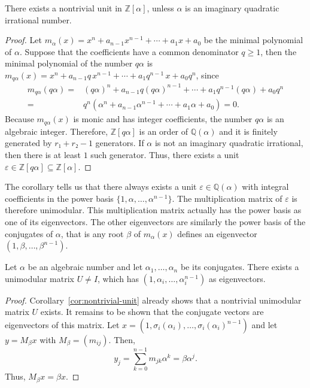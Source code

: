 \begin{corollary}
  \label{cor:nontrivial-unit}
  There exists a nontrivial unit in $ℤ[α]$,
  unless $α$ is an imaginary quadratic irrational number.
\end{corollary}

\begin{proof}
  Let $m_α(x) = x^n + a_{n-1} x^{n-1} + ⋯ + a_1 x + a_0$ be the minimal polynomial of $α$.
  Suppose that the coefficients have a common denominator $q ≥ 1$,
  then the minimal polynomial of the number $q α$ is
  $m_{q α}(x) = x^n + a_{n-1} q \, x^{n-1} + ⋯ + a_1 q^{n-1} \, x + a_0 q^n$,
  since
  \begin{align*}
    m_{qα}(qα) = {} & (q α)^n + a_{n-1} q (q α)^{n-1} + ⋯ + a_1 q^{n-1} (q α) + a_0 q^n \\
     = {}           & q^n (α^n + a_{n-1} α^{n-1} + ⋯ + a_1 α + a_0) = 0.
  \end{align*}
  Because $m_{qα}(x)$ is monic and has integer coefficients,
  the number $q α$ is an algebraic integer.
  Therefore, $ℤ[qα]$ is an order of $ℚ(α)$ and it is finitely generated by $r₁ + r₂ - 1$ generators.
  If $α$ is not an imaginary quadratic irrational, then there is at least $1$ such generator.
  Thus, there exists a unit $ε ∈ ℤ[q α] ⊆ ℤ[α]$.
\end{proof}

The corollary tells us that there always exists a unit $ε ∈ ℚ(α)$ with integral
coefficients in the power basis $\{1, α, …, α^{n-1}\}$.
The multiplication matrix of $ε$ is therefore unimodular.
This multiplication matrix actually has the power basis as one of its eigenvectors.
The other eigenvectors are similarly the power basis of the conjugates of $α$,
that is any root $β$ of $m_α(x)$ defines an eigenvector $(1, β, …, β^{n-1})$.

\begin{theorem}
  \label{thm:unimodular-algebraic}
  Let $α$ be an algebraic number and let $α_1, …, α_n$ be its conjugates.
  There exists a unimodular matrix $U ≠ I$,
  which has $(1, α_i, …, α_i^{n-1})$ as eigenvectors.
\end{theorem}

\begin{proof}
  Corollary~\ref{cor:nontrivial-unit}
  already shows that a nontrivial unimodular matrix $U$ exists.
  It remains to be shown that the conjugate vectors are eigenvectors of this matrix.
  Let $x = (1, σ_i(α_i), …, σ_i(α_i)^{n-1})$ and let $y = M_β x$ with $M_β = (m_{ij})$.
  Then,
  \[
    y_j = \sum_{k=0}^{n-1} m_{jk} α^k = β α^j.
  \]
  Thus, $M_β x = β x$.
\end{proof}

